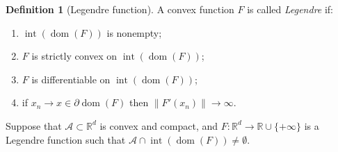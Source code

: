 \documentclass{article}
\theoremstyle{plain}
\theoremstyle{definition}
\newtheorem{definition}[theorem]{Definition}
\newcommand{\dom}[1]{\operatorname{dom}(#1)}
\newcommand{\R}{\mathbb R}
\newcommand{\Rd}{\mathbb{R}^d}
\newcommand{\cA}{\mathcal A}
\newcommand{\interior}{\operatorname{int}}
\begin{document}
\begin{mdframed}
    \begin{definition}[Legendre function]
        A convex function $F$ is called \emph{Legendre} if:
        \begin{enumerate}
            \item $\interior(\dom{F})$ is nonempty;
            \item $F$ is strictly convex on $\interior(\dom{F})$;
            \item $F$ is differentiable on $\interior(\dom{F})$;
            \item if $x_n\to x\in\partial\dom{F}$ then $\|F'(x_n)\|\to\infty$.
        \end{enumerate}
    \end{definition}
\end{mdframed}

Suppose that $\cA \subset \Rd$ is convex and compact,
and $F: \Rd \to \R \cup \{+\infty\}$ is a Legendre function such that $\cA \cap \interior(\dom{F}) \neq \emptyset$.
\end{document}
